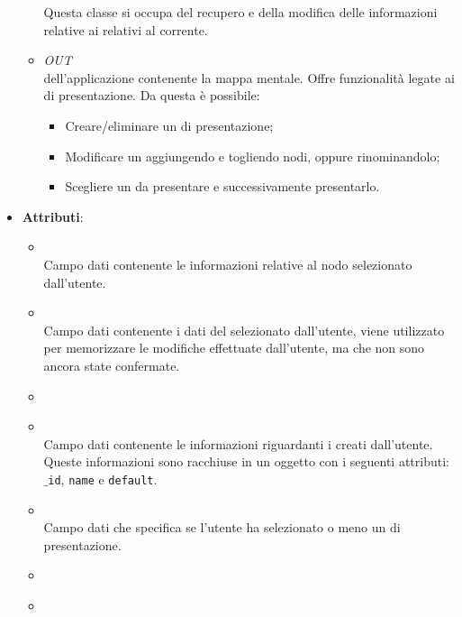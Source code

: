 \begin{itemize}
\begin{itemize}
Questa classe si occupa del recupero e della modifica delle informazioni relative ai  relativi al  corrente.
\item \textit{OUT} \hyperref[\nogloxy{Premi::Front-End::Views::PathsEditorView}]{}\\
 dell’applicazione contenente la mappa mentale. Offre funzionalità legate ai  di presentazione.
Da questa  è possibile:
\begin{itemize}
\item Creare/eliminare un  di presentazione;
\item Modificare un  aggiungendo e togliendo nodi, oppure rinominandolo;
\item Scegliere un  da presentare e successivamente presentarlo.
\end{itemize}
\end{itemize}
\item \textbf{Attributi}:
\begin{itemize}
\item {}
\\ Campo dati contenente le informazioni relative al nodo selezionato dall'utente.
\item {}
\\ Campo dati contenente i dati del  selezionato dall'utente, viene utilizzato per memorizzare le modifiche effettuate dall'utente, ma che non sono ancora state confermate.
\item {}
\\ \dpNodeServiceField
\item {}
\\ Campo dati contenente le informazioni riguardanti i  creati dall'utente. Queste informazioni sono racchiuse in un oggetto con i seguenti attributi: \texttt{$\_$id}, \texttt{name} e \texttt{default}.
\item {}
\\ Campo dati che specifica se l'utente ha selezionato o meno un  di presentazione.
\item {}
\\ \dpPathServiceField
\item {}

\end{itemize}
\end{itemize}
